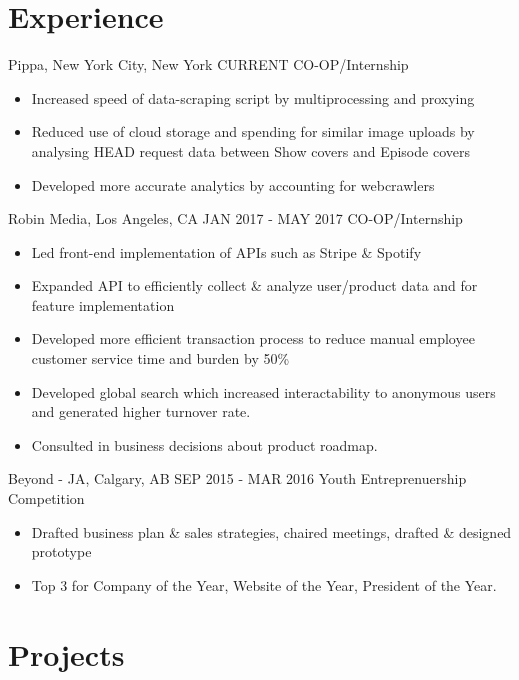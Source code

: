 \documentclass[]{friggeri-cv}
\begin{document}
\section{Experience}

\begin{entrylist}
	\entry
	{Pippa, New York City, New York}
	{CURRENT CO-OP/Internship}
	{
		\begin{itemize}[topsep=3pt,leftmargin=*]
			\item Increased speed of data-scraping script by multiprocessing and proxying
			\item Reduced use of cloud storage and spending for similar image uploads by analysing HEAD request data between Show covers and Episode covers
			\item Developed more accurate analytics by accounting for webcrawlers
		\end{itemize}
	}
	\entry
	{Robin Media, Los Angeles, CA}
	{JAN 2017 - MAY 2017 CO-OP/Internship}
	{
		\begin{itemize}[topsep=3pt,leftmargin=*]
			\item Led front-end implementation of APIs such as Stripe \& Spotify
			\item Expanded API to efficiently collect \& analyze user/product data and for feature implementation
			\item Developed more efficient transaction process to reduce manual employee customer service time and burden by 50\%
			\item Developed global search which increased interactability to anonymous users and generated higher turnover rate.
			\item Consulted in business decisions about product roadmap.
		\end{itemize}
	}
	\entry
	{Beyond - JA, Calgary, AB}
	{SEP 2015 - MAR 2016 Youth Entreprenuership Competition}
	{
		\begin{itemize}[topsep=3pt,leftmargin=*]
			\item Drafted business plan \& sales strategies, chaired meetings, drafted \& designed prototype
			\item Top 3 for Company of the Year, Website of the Year, President of the Year.
	\end{itemize}}
\end{entrylist}

\section{Projects}
\end{document}
